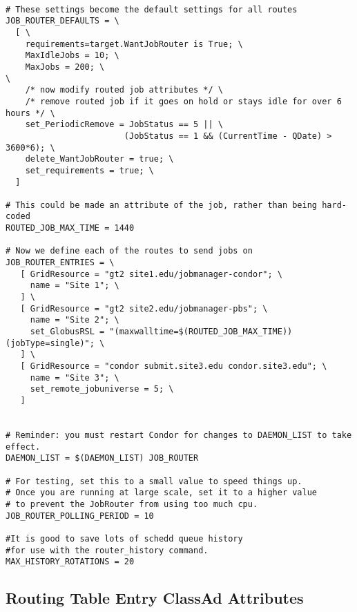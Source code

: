 \footnotesize
\begin{verbatim}

# These settings become the default settings for all routes
JOB_ROUTER_DEFAULTS = \
  [ \
    requirements=target.WantJobRouter is True; \
    MaxIdleJobs = 10; \
    MaxJobs = 200; \
\
    /* now modify routed job attributes */ \
    /* remove routed job if it goes on hold or stays idle for over 6 hours */ \
    set_PeriodicRemove = JobStatus == 5 || \
                        (JobStatus == 1 && (CurrentTime - QDate) > 3600*6); \
    delete_WantJobRouter = true; \
    set_requirements = true; \
  ]

# This could be made an attribute of the job, rather than being hard-coded
ROUTED_JOB_MAX_TIME = 1440

# Now we define each of the routes to send jobs on
JOB_ROUTER_ENTRIES = \
   [ GridResource = "gt2 site1.edu/jobmanager-condor"; \
     name = "Site 1"; \
   ] \
   [ GridResource = "gt2 site2.edu/jobmanager-pbs"; \
     name = "Site 2"; \
     set_GlobusRSL = "(maxwalltime=$(ROUTED_JOB_MAX_TIME))(jobType=single)"; \
   ] \
   [ GridResource = "condor submit.site3.edu condor.site3.edu"; \
     name = "Site 3"; \
     set_remote_jobuniverse = 5; \
   ]


# Reminder: you must restart Condor for changes to DAEMON_LIST to take effect.
DAEMON_LIST = $(DAEMON_LIST) JOB_ROUTER

# For testing, set this to a small value to speed things up.
# Once you are running at large scale, set it to a higher value
# to prevent the JobRouter from using too much cpu.
JOB_ROUTER_POLLING_PERIOD = 10

#It is good to save lots of schedd queue history
#for use with the router_history command.
MAX_HISTORY_ROTATIONS = 20
\end{verbatim}
\normalsize



\subsection{\label{RoutingTableAttributes} Routing Table Entry ClassAd Attributes}


